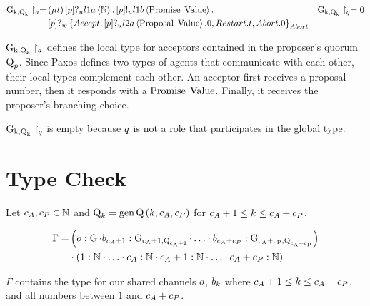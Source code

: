 \begin{align*}
\operatorname{G_{k, \operatorname{Q}_{k}}} \upharpoonright_{a} =
&
    \left(\mu t\right)
    \left[p\right]?_u l1a \left\langle \mathbb{N} \right\rangle .
    \left[p\right]!_u l1b \left\langle \operatorname{Promise}\; \operatorname{Value} \right\rangle .
&\operatorname{G_{k, \operatorname{Q}_{k}}} \upharpoonright_{q} = 0\\
&
    \left[p\right]?_w \left\{
        \mathnormal{Accept} .
            \left[p\right]?_u l2a \left\langle \operatorname{Proposal}\; \operatorname{Value} \right\rangle.
            0
        ,\mathnormal{Restart} .
            t
        ,\mathnormal{Abort} .
            0
    \right\}_{\mathnormal{Abort}}
\end{align*}

$\operatorname{G_{k, \operatorname{Q}_{k}}} \upharpoonright_{a}$ defines the local type for acceptors contained in the proposer's quorum $\operatorname{Q}_{p}$.
Since Paxos defines two types of agents that communicate with each other, their local types complement each other.
An acceptor first receives a proposal number, then it responds with a $\operatorname{Promise}\; \operatorname{Value}$.
Finally, it receives the proposer's branching choice.

$\operatorname{G_{k, \operatorname{Q}_{k}}} \upharpoonright_{q}$ is empty because $q$ is not a role that participates in the global type.

\section{Type Check}
Let $c_A,c_P\in\mathbb{N}$ and $\operatorname{Q}_{k} = \operatorname{gen\operatorname{Q}}\left(k, c_A, c_P\right)$ for $c_A + 1 \leq k \leq c_A + c_P$.

\begin{align*}
\Gamma =
    &\left(
    o:\operatorname{G}
    \cdot b_{c_A+1}:\operatorname{G_{c_A+1, \operatorname{Q}_{c_A+1}}} \cdot \ldots
    \cdot b_{c_A+c_P}:\operatorname{G_{c_A+c_P, \operatorname{Q}_{c_A+c_P}}}
    \right)\\
&\cdot
    \left(
    1:\mathbb{N}
    \cdot \ldots
    \cdot c_A:\mathbb{N}
    \cdot c_A + 1:\mathbb{N}
    \cdot \ldots
    \cdot c_A + c_P:\mathbb{N}
    \right)
\end{align*}

$\Gamma$ contains the type for our shared channels $o$, $b_{k}$ where $c_A + 1 \leq k \leq c_A + c_P$, and all numbers between $1$ and $c_A + c_P$.

